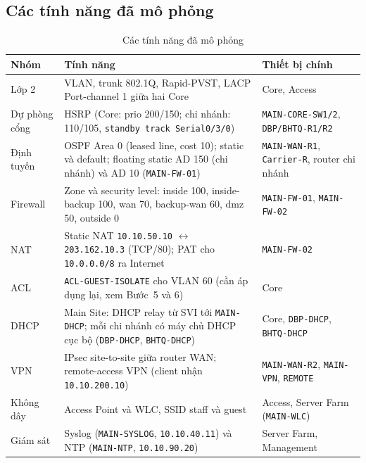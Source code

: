 \subsection{Các tính năng đã mô phỏng}
\begin{small}
\setlength{\tabcolsep}{4pt}
\begin{longtable}{|p{2.2cm}|p{7.8cm}|p{3.8cm}|}
\caption{Các tính năng đã mô phỏng} \label{tab:sim_features} \\
\hline
\textbf{Nhóm} & \textbf{Tính năng} & \textbf{Thiết bị chính} \\ \hline
\endhead
Lớp 2 & VLAN, trunk 802.1Q, Rapid-PVST, LACP Port-channel 1 giữa hai Core & Core, Access \\ \hline
Dự phòng cổng & HSRP (Core: prio 200/150; chi nhánh: 110/105, \texttt{standby track Serial0/3/0}) & \texttt{MAIN-CORE-SW1/2}, \texttt{DBP/BHTQ-R1/R2} \\ \hline
Định tuyến & OSPF Area 0 (leased line, cost 10); static và default; floating static AD 150 (chi nhánh) và AD 10 (\texttt{MAIN-FW-01}) & \texttt{MAIN-WAN-R1}, \texttt{Carrier-R}, router chi nhánh \\ \hline
Firewall & Zone và security level: inside 100, inside-backup 100, wan 70, backup-wan 60, dmz 50, outside 0 & \texttt{MAIN-FW-01}, \texttt{MAIN-FW-02} \\ \hline
NAT & Static NAT \texttt{10.10.50.10} $\leftrightarrow$ \texttt{203.162.10.3} (TCP/80); PAT cho \texttt{10.0.0.0/8} ra Internet & \texttt{MAIN-FW-02} \\ \hline
ACL & \texttt{ACL-GUEST-ISOLATE} cho VLAN 60 (cần áp dụng lại, xem Bước~5 và 6) & Core \\ \hline
DHCP & Main Site: DHCP relay từ SVI tới \texttt{MAIN-DHCP}; mỗi chi nhánh có máy chủ DHCP cục bộ (\texttt{DBP-DHCP}, \texttt{BHTQ-DHCP}) & Core, \texttt{DBP-DHCP}, \texttt{BHTQ-DHCP} \\ \hline
VPN & IPsec site-to-site giữa router WAN; remote-access VPN (client nhận \texttt{10.10.200.10}) & \texttt{MAIN-WAN-R2}, \texttt{MAIN-VPN}, \texttt{REMOTE} \\ \hline
Không dây & Access Point và WLC, SSID staff và guest & Access, Server Farm (\texttt{MAIN-WLC}) \\ \hline
Giám sát & Syslog (\texttt{MAIN-SYSLOG}, \texttt{10.10.40.11}) và NTP (\texttt{MAIN-NTP}, \texttt{10.10.90.20}) & Server Farm, Management \\ \hline
\end{longtable}
\end{small}


